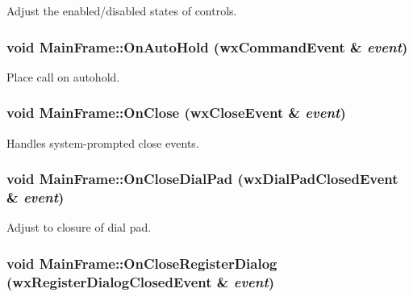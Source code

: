 Adjust the enabled/disabled states of controls. 

\hypertarget{classMainFrame_bcbd80572652cfe2bc9736704149d003}{
\subsubsection[{OnAutoHold}]{\setlength{\rightskip}{0pt plus 5cm}void MainFrame::OnAutoHold (wxCommandEvent \& {\em event})}}
\label{classMainFrame_bcbd80572652cfe2bc9736704149d003}


Place call on autohold. 

\hypertarget{classMainFrame_9f6f7f89d8b9aded1334cfa6eaca22bc}{
\subsubsection[{OnClose}]{\setlength{\rightskip}{0pt plus 5cm}void MainFrame::OnClose (wxCloseEvent \& {\em event})}}
\label{classMainFrame_9f6f7f89d8b9aded1334cfa6eaca22bc}


Handles system-prompted close events. 

\hypertarget{classMainFrame_c334df080d070c2f82c9457ad132ce18}{
\subsubsection[{OnCloseDialPad}]{\setlength{\rightskip}{0pt plus 5cm}void MainFrame::OnCloseDialPad ({\bf wxDialPadClosedEvent} \& {\em event})}}
\label{classMainFrame_c334df080d070c2f82c9457ad132ce18}


Adjust to closure of dial pad. 

\hypertarget{classMainFrame_a23ae1cbbe9db200b96285a46f23b6c3}{
\subsubsection[{OnCloseRegisterDialog}]{\setlength{\rightskip}{0pt plus 5cm}void MainFrame::OnCloseRegisterDialog ({\bf wxRegisterDialogClosedEvent} \& {\em event})}}
\label{classMainFrame_a23ae1cbbe9db200b96285a46f23b6c3}


